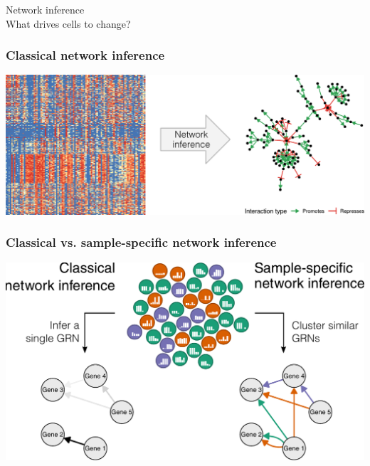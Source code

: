 \documentclass[usepdftitle=false, compress]{beamer}
\begin{document}

\begin{frame}
	\vfill
	\begin{center}
		\color{set1green}
		{\LARGE Network inference}\\
		What drives cells to change?
	\end{center}
	\vfill
\end{frame}


\begin{frame}
	\frametitle{Classical network inference}
	\begin{center}
		\includegraphics[width=.9\linewidth]{figures/8_networkinference.pdf}
	\end{center}
\end{frame}

\begin{frame}
	\frametitle{Classical vs. sample-specific network inference}
	\begin{center}
		\includegraphics[width=.9\linewidth]{figures/12_nitypes.pdf}
	\end{center}
\end{frame}
\end{document}
